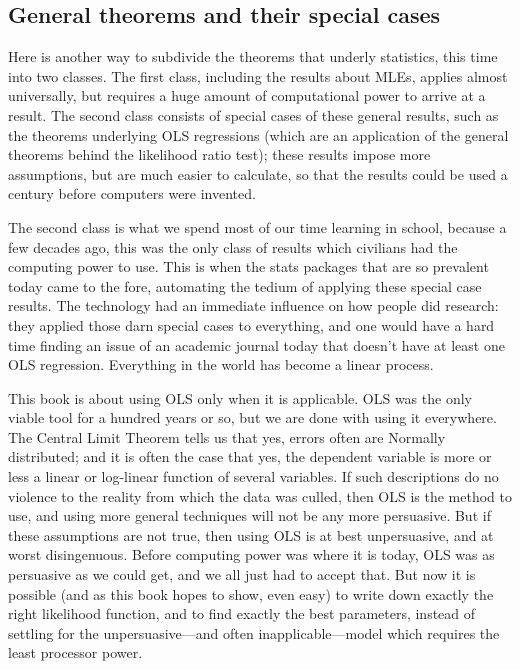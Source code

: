 \documentclass[12pt,notitlepage, openany]{book}
\begin{document}
\subsection{General theorems and their special cases}
Here is another way to subdivide the theorems that underly
statistics, this time into two classes. The first class, including the
results about MLEs, applies almost universally, but requires a huge
amount of computational power to arrive at a result. The second class
consists of special cases of these general results, such as the theorems
underlying OLS regressions (which are an application of the general
theorems behind the likelihood ratio test); these results impose more
assumptions, but are much easier to calculate, so that the results could
be used a century before computers were invented.

The second class is what we spend most of our time learning in school,
because a few decades ago, this was the only class of results which
civilians had the computing power to use. This is when the stats packages
that are so prevalent today came to the fore, automating the tedium of
applying these special case results. The technology had an immediate
influence on how people did research: they applied those darn special
cases to everything, and one would have a hard time finding an issue of an
academic journal today that doesn't have at least one OLS regression.
Everything in the world has become a linear process.

This book is about using OLS only when it is applicable. OLS was the only
viable tool for a hundred years or so, but we are done with using it everywhere.
The Central Limit Theorem tells us that yes, errors often are
Normally distributed; and it is often the case that yes, the dependent
variable is more or less a linear or log-linear function of several
variables. If such descriptions do no violence to the reality from
which the data was culled, then OLS is the method to use, and using
more general techniques will not be any more persuasive. But if these
assumptions are not true, then using OLS is at best unpersuasive, and at
worst disingenuous. Before computing power was where it is today, OLS was
as persuasive as we could get, and we all just had to accept that. But
now it is possible (and as this book hopes to show, even easy) to write
down exactly the right likelihood function, and to find exactly the best
parameters, instead of settling for the unpersuasive---and often
inapplicable---model which requires the least processor power.
\end{document}
